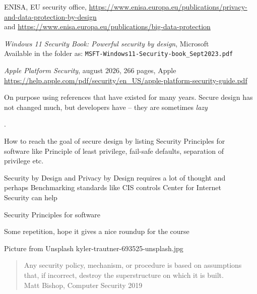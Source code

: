\documentclass[Screen16to9,17pt]{foils}
\begin{document}

\begin{list2}
\item ENISA, EU security office, \url{https://www.enisa.europa.eu/publications/privacy-and-data-protection-by-design}\\ and \url{https://www.enisa.europa.eu/publications/big-data-protection}
\item  \emph{Windows 11 Security Book: Powerful security by design}, Microsoft \\
Available in the folder as: \verb+MSFT-Windows11-Security-book_Sept2023.pdf+
\item \emph{Apple Platform Security}, august 2026, 266 pages, Apple\\
\url{https://help.apple.com/pdf/security/en_US/apple-platform-security-guide.pdf}
\end{list2}


\vskip 2cm
\begin{center}
On purpose using references that have existed for many years. Secure design has not changed much, but developers have -- they are sometimes \emph{lazy}
\end{center}


.

\begin{list2}
\item How to reach the goal of secure design
by listing Security Principles for \\
software like Principle of least privilege, fail-safe defaults, separation of\\
privilege etc.
\item Security by Design and Privacy by Design requires a lot of thought and\\ perhaps Benchmarking standards
like CIS controls Center for Internet\\
 Security can help
\item Security Principles for software
\item Some repetition, hope it gives a nice roundup for the course
\end{list2}

\hfill {\footnotesize Picture from Unsplash kyler-trautner-693525-unsplash.jpg}


\begin{quote}
Any security policy, mechanism, or procedure is based on assumptions that, if incorrect, destroy the superstructure on which it is built.\\
Matt Bishop, Computer Security 2019
\end{quote}
\end{document}
